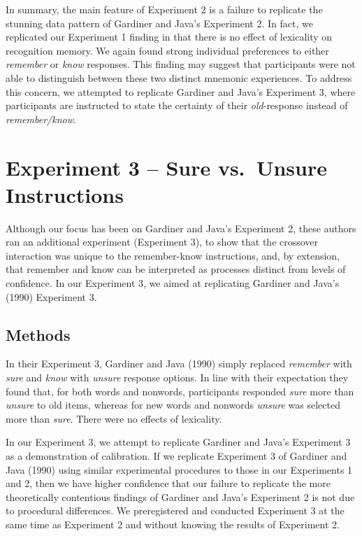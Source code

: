 \documentclass[english,,man]{apa6}
\begin{document}
In summary, the main feature of Experiment 2 is a failure to replicate the stunning data pattern of Gardiner and Java's Experiment 2. In fact, we replicated our Experiment 1 finding in that there is no effect of lexicality on recognition memory. We again found strong individual preferences to either \emph{remember} or \emph{know} responses. This finding may suggest that participants were not able to distinguish between these two distinct mnemonic experiences. To address this concern, we attempted to replicate Gardiner and Java's Experiment 3, where participants are instructed to state the certainty of their \emph{old}-response instead of \emph{remember/know}.

\hypertarget{experiment-3-sure-vs.unsure-instructions}{%
\section{Experiment 3 -- Sure vs.~Unsure Instructions}\label{experiment-3-sure-vs.unsure-instructions}}

Although our focus has been on Gardiner and Java's Experiment 2, these authors ran an additional experiment (Experiment 3), to show that the crossover interaction was unique to the remember-know instructions, and, by extension, that remember and know can be interpreted as processes distinct from levels of confidence. In our Experiment 3, we aimed at replicating Gardiner and Java's (1990) Experiment 3.

\hypertarget{methods-2}{%
\subsection{Methods}\label{methods-2}}

In their Experiment 3, Gardiner and Java (1990) simply replaced \emph{remember} with \emph{sure} and \emph{know} with \emph{unsure} response options. In line with their expectation they found that, for both words and nonwords, participants responded \emph{sure} more than \emph{unsure} to old items, whereas for new words and nonwords \emph{unsure} was selected more than \emph{sure}. There were no effects of lexicality.

In our Experiment 3, we attempt to replicate Gardiner and Java's Experiment 3 as a demonstration of calibration. If we replicate Experiment 3 of Gardiner and Java (1990) using similar experimental procedures to those in our Experiments 1 and 2, then we have higher confidence that our failure to replicate the more theoretically contentious findings of Gardiner and Java's Experiment 2 is not due to procedural differences. We preregistered and conducted Experiment 3 at the same time as Experiment 2 and without knowing the results of Experiment 2.
\end{document}
